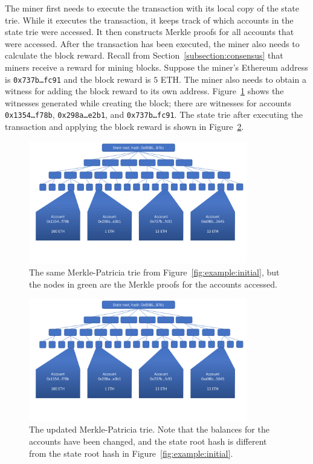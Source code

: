 \documentclass[12pt]{article}
\newcommand{\figurewidth}{0.85\textwidth}
\begin{document}
The miner first needs to execute the transaction with its local copy of the state trie. While it executes the transaction, it keeps track of which accounts in the state trie were accessed. It then constructs Merkle proofs for all accounts that were accessed. After the transaction has been executed, the miner also needs to calculate the block reward. Recall from Section~\ref{subsection:consensus} that miners receive a reward for mining blocks. Suppose the miner's Ethereum address is \texttt{0x737b\ldots fc91} and the block reward is $5$ ETH. The miner also needs to obtain a witness for adding the block reward to its own address. Figure~\ref{fig:example:proof} shows the witnesses generated while creating the block; there are witnesses for accounts \texttt{0x1354\ldots f78b}, \texttt{0x298a\ldots e2b1}, and \texttt{0x737b\ldots fc91}. The state trie after executing the transaction and applying the block reward is shown in Figure~\ref{fig:example:newstate}.

\begin{figure}[H]
  \centering
  \includegraphics[width=\figurewidth,page=3]{../figures/design/example.pdf}
  \caption{The same Merkle-Patricia trie from Figure~\ref{fig:example:initial}, but the nodes in green are the Merkle proofs for the accounts accessed.}
  \label{fig:example:proof}
\end{figure}

\begin{figure}[H]
  \centering
  \includegraphics[width=\figurewidth,page=4]{../figures/design/example.pdf}
  \caption{The updated Merkle-Patricia trie. Note that the balances for the accounts have been changed, and the state root hash is different from the state root hash in Figure~\ref{fig:example:initial}.}
  \label{fig:example:newstate}
\end{figure}
\end{document}
